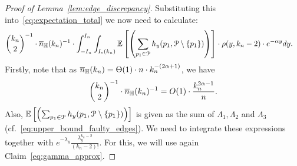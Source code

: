 \begin{proof}[Proof of Lemma~\ref{lem:edge_discrepancy}]
Substituting this into~\eqref{eq:expectation_total} we now need to calculate:
\begin{align*}
&{k_n\choose 2}^{-1}\cdot \overline{n}_{\mathbb{H}}(k_n)^{-1} \cdot \int_{-I_n}^{I_n} 
\int_{I_\varepsilon(k_n)} \mathbb{E}\left[\left( \sum_{p_1 \in {\mathcal P}} h_y (p_1, {\mathcal P} \setminus \{ p_1 \})\right)\right] \cdot 
 \rho(y,k_n-2) \cdot e^{-\alpha y} dy.
\end{align*}
Firstly, note that as $\overline{n}_{\mathbb{H}}(k_n) = \Theta (1) \cdot n \cdot k_n^{-(2\alpha +1)}$, we have 
$$ {k_n\choose 2}^{-1}\cdot \overline{n}_{\mathbb{H}}(k_n)^{-1} = O(1) \cdot \frac{k_n^{2\alpha-1}}{n}.$$
Also, $\mathbb{E}\left[\left( \sum_{p_1 \in {\mathcal P}} h_y (p_1, {\mathcal P} \setminus \{ p_1 \})\right)\right]$ is given 
as the sum of $\Lambda_1, \Lambda_2$ and $\Lambda_3$ (cf.~\eqref{eq:upper_bound_faulty_edges}). 
We need to integrate these expressions together with $e^{-\lambda_y} \frac{\lambda_y^{k_n-2}}{(k_n-2)!}$.
For this, we will use again Claim~\ref{eq:gamma_approx}.



\end{proof}
